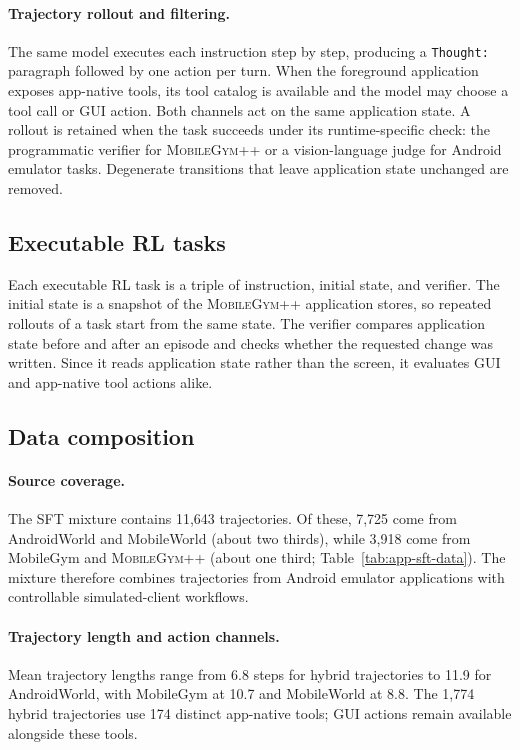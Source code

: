 \paragraph{Trajectory rollout and filtering.}
The same model executes each instruction step by step, producing a \texttt{Thought:} paragraph followed by one action per turn. When the foreground application exposes app-native tools, its tool catalog is available and the model may choose a tool call or GUI action. Both channels act on the same application state. A rollout is retained when the task succeeds under its runtime-specific check: the programmatic verifier for \textsc{MobileGym++} or a vision-language judge for Android emulator tasks. Degenerate transitions that leave application state unchanged are removed.

\subsection{Executable RL tasks}
\label{app:rl-data}
Each executable RL task is a triple of instruction, initial state, and verifier. The initial state is a snapshot of the \textsc{MobileGym++} application stores, so repeated rollouts of a task start from the same state. The verifier compares application state before and after an episode and checks whether the requested change was written. Since it reads application state rather than the screen, it evaluates GUI and app-native tool actions alike.

\subsection{Data composition}
\label{app:data-quality}

\paragraph{Source coverage.}
The SFT mixture contains 11,643 trajectories. Of these, 7,725 come from AndroidWorld and MobileWorld (about two thirds), while 3,918 come from MobileGym and \textsc{MobileGym++} (about one third; Table~\ref{tab:app-sft-data}). The mixture therefore combines trajectories from Android emulator applications with controllable simulated-client workflows.

\paragraph{Trajectory length and action channels.}
Mean trajectory lengths range from 6.8 steps for hybrid trajectories to 11.9 for AndroidWorld, with MobileGym at 10.7 and MobileWorld at 8.8. The 1,774 hybrid trajectories use 174 distinct app-native tools; GUI actions remain available alongside these tools.

